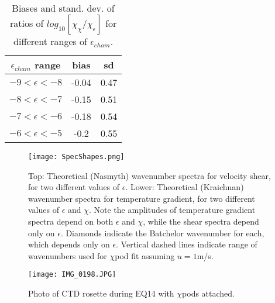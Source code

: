 \documentclass{ametsoc}
\begin{document}
\begin{table}[t]
\caption{Biases and stand. dev. of ratios of $log_{10} [\chi_{\chi}/\chi_{\epsilon}]$ for different ranges of $\epsilon_{cham}$.}\label{t1}
\begin{center}
\begin{tabular}{|c|c|c|}
\hline\hline
$\epsilon_{cham}$ range & bias & sd \\ 
\hline
$-9 < \epsilon < -8$ & -0.04 & 0.47 \\ 
\hline
$-8 < \epsilon < -7$ & -0.15 & 0.51 \\ 
\hline
$-7 < \epsilon < -6$ & -0.18 & 0.54 \\ 
\hline
$-6 < \epsilon < -5$ & -0.2 & 0.55 \\ 
\hline
\hline\hline
\end{tabular}
\end{center}
\end{table}


%

\graphicspath{
{/Users/Andy/Cruises_Research/ChiPod/ChiPod_Methods_Paper/figures/}
}

\begin{figure}[t]
  \noindent\texttt{[image: SpecShapes.png]}\\
  \caption{Top: Theoretical (Nasmyth) wavenumber spectra for velocity shear, for two different values of $\epsilon$. Lower: Theoretical (Kraichnan) wavenumber spectra for temperature gradient, for two different values of $\epsilon$ and $\chi$. Note the amplitudes of temperature gradient spectra depend on both $\epsilon$ and $\chi$, while the shear spectra depend only on $\epsilon$. Diamonds indicate the Batchelor wavenumber for each, which depends only on $\epsilon$. Vertical dashed lines indicate range of wavenumbers used for $\chi$pod fit assuming $u=1$m/s.}
  \label{specshapes}
\end{figure}


\begin{figure}[t]
  \noindent\texttt{[image: IMG\_0198.JPG]}\\
  \caption{Photo of CTD rosette during EQ14 with $\chi$pods attached.}
  \label{f1}
\end{figure}
\end{document}
